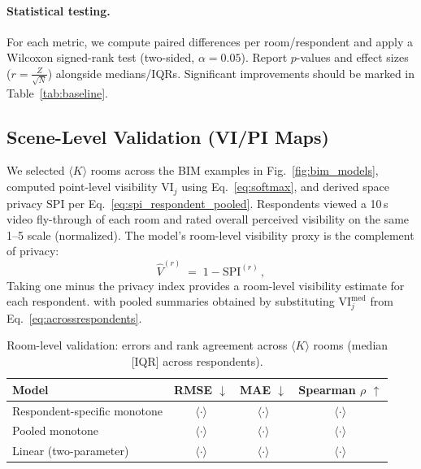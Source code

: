\documentclass[final,3p,times,review]{elsarticle}
\begin{document}
\paragraph{Statistical testing.}
For each metric, we compute paired differences per room/respondent and apply a Wilcoxon signed-rank test (two-sided, $\alpha{=}0.05$). Report $p$-values and effect sizes ($r{=}\tfrac{Z}{\sqrt{N}}$) alongside medians/IQRs. Significant improvements should be marked in Table~\ref{tab:baseline}.

\subsection{Scene-Level Validation (VI/PI Maps)}
We selected $\langle K \rangle$ rooms across the BIM examples in Fig.~\ref{fig:bim_models}, computed point-level visibility $\mathrm{VI}_j$ using Eq.~\eqref{eq:softmax}, and derived space privacy $\mathrm{SPI}$ per Eq.~\eqref{eq:spi_respondent_pooled}. Respondents viewed a 10\,s video fly-through of each room and rated overall perceived visibility on the same 1--5 scale (normalized). The model’s room-level visibility proxy is the complement of privacy:
\begin{equation}
\widehat{V}^{(r)} \;=\; 1 - \mathrm{SPI}^{(r)} \,,
\label{eq:room-visibility-proxy}
\end{equation}
Taking one minus the privacy index provides a room-level visibility estimate for each respondent.
with pooled summaries obtained by substituting $\mathrm{VI}_j^{\mathrm{med}}$ from Eq.~\eqref{eq:acrossrespondents}.

\begin{table}[H]
\centering
\caption{Room-level validation: errors and rank agreement across $\langle K\rangle$ rooms (median [IQR] across respondents).}
\label{tab:room-validation}
\begin{tabular}{@{}lccc@{}}
\toprule
Model & RMSE $\downarrow$ & MAE $\downarrow$ & Spearman $\rho$ $\uparrow$ \\
\midrule
Respondent-specific monotone & $\langle \cdot \rangle$ & $\langle \cdot \rangle$ & $\langle \cdot \rangle$ \\
Pooled monotone & $\langle \cdot \rangle$ & $\langle \cdot \rangle$ & $\langle \cdot \rangle$ \\
Linear (two-parameter) & $\langle \cdot \rangle$ & $\langle \cdot \rangle$ & $\langle \cdot \rangle$ \\
\bottomrule
\end{tabular}
\end{table}
\end{document}

